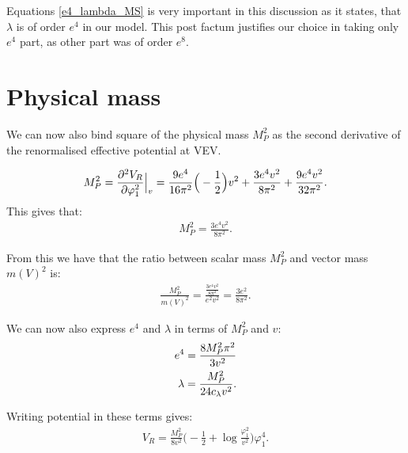 Equations \ref{e4_lambda_MS} is very important in this discussion as it states, that $\lambda$ 
is of order $e^4$ in our model. This post factum justifies our 
choice in taking only $e^4$ part, as other part was of order $e^8$. \\

\section{Physical mass}\label{MSbar physical mass}
We can now also bind square of the physical mass $M_P^2$ as the second derivative of the 
renormalised effective potential at VEV.

\begin{align}
M_P^2 = \frac{\partial^2 V_R}{\partial \varphi_1^2} \Big|_v = \frac{9e^4}{16\pi^2}\Big(-\frac{1}{2}\Big)v^2+\frac{3e^4v^2}{8\pi^2} 
+\frac{9e^4v^2}{32\pi^2}.
\end{align}
This gives that:
\begin{align}
M_P^2 = \frac{3e^4v^2}{8\pi^2}.
\end{align}

From this we have that the ratio between scalar mass $M_P^2$ and vector mass $m(V)^2$ is:
\begin{align}
\frac{M_P^2}{m(V)^2} = \frac{\frac{3e^4v^2}{8\pi^2}}{e^2v^2} = \frac{3e^2}{8\pi^2}.
\end{align}

We can now also express $e^4$ and $\lambda$ in terms of $M_P^2$ and $v$:
\begin{align}
e^4 = \frac{8M_P^2\pi^2}{3v^2} \\
\lambda = \frac{M_P^2}{24c_\lambda v^2}.
\end{align}

Writing potential in these terms gives:
\begin{align}
V_R = \frac{M_P^2}{8v^2}\Big(-\frac{1}{2}+\log\frac{\varphi_1^2}{v^2}\Big)\varphi_1^4.
\end{align}


